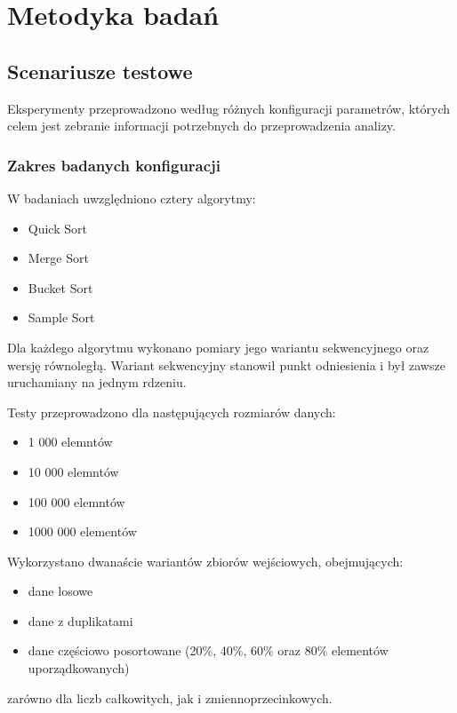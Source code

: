 \cleardoublepage
\chapter{Metodyka badań}
\label{cha:MetodykaBadan}

\section{Scenariusze testowe}
\label{sec:ScenariuszeTestowe}

Eksperymenty przeprowadzono według różnych konfiguracji parametrów, których celem jest zebranie informacji potrzebnych do przeprowadzenia analizy.

\subsection{Zakres badanych konfiguracji}

W badaniach uwzględniono cztery algorytmy:
\begin{itemize}
    \item Quick Sort
    \item Merge Sort
    \item Bucket Sort
    \item Sample Sort
\end{itemize}

Dla każdego algorytmu wykonano pomiary jego wariantu sekwencyjnego oraz wersję równoległą. 
Wariant sekwencyjny stanowił punkt odniesienia i był zawsze uruchamiany na jednym rdzeniu.

Testy przeprowadzono dla następujących rozmiarów danych:
\begin{itemize}
    \item 1 000 elemntów
    \item 10 000 elemntów
    \item 100 000 elemntów
    \item 1000 000 elementów
\end{itemize}

Wykorzystano dwanaście wariantów zbiorów wejściowych, obejmujących:
\begin{itemize}
    \item dane losowe
    \item dane z duplikatami
    \item dane częściowo posortowane (20\%, 40\%, 60\% oraz 80\% elementów uporządkowanych)
\end{itemize}
zarówno dla liczb całkowitych, jak i zmiennoprzecinkowych.

